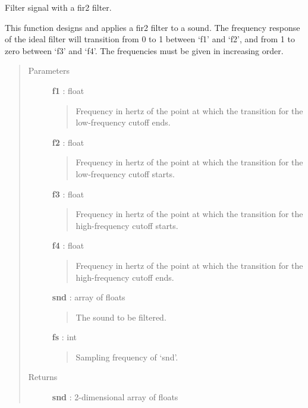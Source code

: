 \documentclass[a4paper,12pt,english]{sphinxmanual}
\begin{document}
\begin{fulllineitems}
\label{sndlib:sndlib.fir2Filt}
Filter signal with a fir2 filter.

This function designs and applies a fir2 filter to a sound.
The frequency response of the ideal filter will transition
from 0 to 1 between `f1' and `f2', and from 1 to zero
between `f3' and `f4'. The frequencies must be given in
increasing order.
\begin{quote}\begin{description}
\item[{Parameters }] \leavevmode
\textbf{f1} : float
\begin{quote}

Frequency in hertz of the point at which the transition
for the low-frequency cutoff ends.
\end{quote}

\textbf{f2} : float
\begin{quote}

Frequency in hertz of the point at which the transition
for the low-frequency cutoff starts.
\end{quote}

\textbf{f3} : float
\begin{quote}

Frequency in hertz of the point at which the transition
for the high-frequency cutoff starts.
\end{quote}

\textbf{f4} : float
\begin{quote}

Frequency in hertz of the point at which the transition
for the high-frequency cutoff ends.
\end{quote}

\textbf{snd} : array of floats
\begin{quote}

The sound to be filtered.
\end{quote}

\textbf{fs} : int
\begin{quote}

Sampling frequency of `snd'.
\end{quote}

\item[{Returns }] \leavevmode
\textbf{snd} : 2-dimensional array of floats

\end{description}\end{quote}

\end{fulllineitems}
\end{document}
